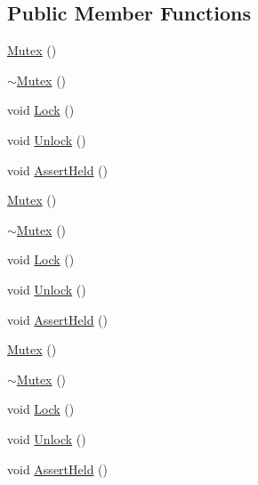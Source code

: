 \subsection*{Public Member Functions}
\begin{DoxyCompactItemize}
\item 
\hyperlink{classleveldb_1_1port_1_1_mutex_ab8f26966b881db1fd96839df85e5c583}{Mutex} ()
\item 
\hyperlink{classleveldb_1_1port_1_1_mutex_a86acffb44e6134be2e8398e6f3be6abc}{$\sim$\+Mutex} ()
\item 
void \hyperlink{classleveldb_1_1port_1_1_mutex_a9a4da7195ce1802c077bc4d0035d4dd1}{Lock} ()
\item 
void \hyperlink{classleveldb_1_1port_1_1_mutex_a9d69a21c53dad7732b2006acf87f006b}{Unlock} ()
\item 
void \hyperlink{classleveldb_1_1port_1_1_mutex_a9793393529f59bbb4adaf152bbbab42c}{Assert\+Held} ()
\item 
\hyperlink{classleveldb_1_1port_1_1_mutex_ab8f26966b881db1fd96839df85e5c583}{Mutex} ()
\item 
\hyperlink{classleveldb_1_1port_1_1_mutex_a86acffb44e6134be2e8398e6f3be6abc}{$\sim$\+Mutex} ()
\item 
void \hyperlink{classleveldb_1_1port_1_1_mutex_a9a4da7195ce1802c077bc4d0035d4dd1}{Lock} ()
\item 
void \hyperlink{classleveldb_1_1port_1_1_mutex_a9d69a21c53dad7732b2006acf87f006b}{Unlock} ()
\item 
void \hyperlink{classleveldb_1_1port_1_1_mutex_a9793393529f59bbb4adaf152bbbab42c}{Assert\+Held} ()
\item 
\hyperlink{classleveldb_1_1port_1_1_mutex_ab8f26966b881db1fd96839df85e5c583}{Mutex} ()
\item 
\hyperlink{classleveldb_1_1port_1_1_mutex_a86acffb44e6134be2e8398e6f3be6abc}{$\sim$\+Mutex} ()
\item 
void \hyperlink{classleveldb_1_1port_1_1_mutex_a9a4da7195ce1802c077bc4d0035d4dd1}{Lock} ()
\item 
void \hyperlink{classleveldb_1_1port_1_1_mutex_a9d69a21c53dad7732b2006acf87f006b}{Unlock} ()
\item 
void \hyperlink{classleveldb_1_1port_1_1_mutex_a9793393529f59bbb4adaf152bbbab42c}{Assert\+Held} ()
\end{DoxyCompactItemize}
